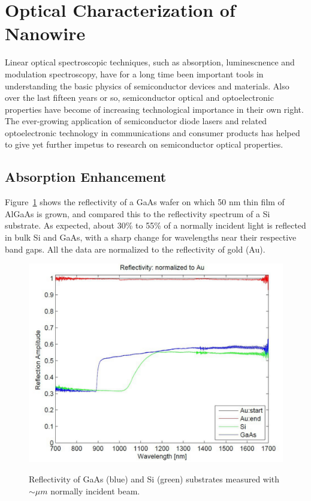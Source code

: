 \section{Optical Characterization of Nanowire}

Linear optical spectroscopic techniques, such as absorption, luminescnence and
modulation spectroscopy, have for a long time been important tools in
understanding the basic physics of semiconductor devices and materials. Also
over the last fifteen years or so, semiconductor optical and optoelectronic
properties have become of increasing technological importance in their own
right. The ever-growing application of semiconductor diode lasers and related
optoelectronic technology in communications and consumer products has helped to
give yet further impetus to research on semiconductor optical properties.

\subsection{Absorption Enhancement} \label{Data_Abs}

Figure~\ref{reflecbulk} shows the reflectivity of a GaAs wafer on which 50 nm
thin film of AlGaAs is grown, and compared this to the reflectivity spectrum of
a Si substrate. As expected, about 30\% to 55\% of a normally incident light is
reflected in bulk Si and GaAs, with a sharp change for wavelengths near their
respective band gaps. All the data are normalized to the reflectivity of gold
(Au).

\begin{figure}
  \caption{Reflectivity of GaAs (blue) and Si (green) substrates measured with $\sim{\mu}m$ normally incident beam.}
  \centering
  \includegraphics[width=\textwidth]{pictures/Data/reflecbulk}
  \label{reflecbulk}
\end{figure}

